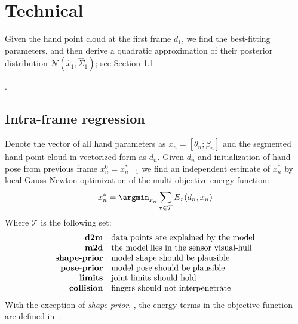 \section{Technical}
Given the hand point cloud at the first frame $d_1$, we find the best-fitting parameters, and then derive a quadratic approximation of their posterior distribution $\mathcal{N}(\hat x_1, \hat \Sigma_1)$; see Section \ref{sec:independent}.

.

\subsection{Intra-frame regression }
\label{sec:independent}
% 
Denote the vector of all hand parameters as $x_n = [\theta_n; \beta_n]$ and the segmented hand point cloud in vectorized form as $d_n$. Given $d_n$ and initialization of hand pose from previous frame $x_n^0 = x_{n - 1}^*$ we find an independent estimate of $x_n^*$ by local Gauss-Newton optimization of the multi-objective energy function:
% 
\begin{equation}
x_n^* = \argmin_{x_n} \sum_{\tau \in \mathcal{T}} E_{\tau}(d_n, x_n) 
\label{eq:energies}
\end{equation}
% 
Where $\mathcal{T}$ is the following set:
%
\vspace{-.5\parskip}
\begin{equation*}
\setlength{\jot}{0pt}
\begin{aligned}
\text{\textbf{d2m}} & \quad \text{data points are explained by the model} \\ 
\text{\textbf{m2d}} & \quad \text{the model lies in the sensor visual-hull} \\
\text{\textbf{shape-prior}} & \quad \text{model shape should be plausible} \\
\text{\textbf{pose-prior}} & \quad \text{model pose should be plausible} \\
\text{\textbf{limits}} & \quad \text{joint limits should hold} \\
\text{\textbf{collision}} & \quad \text{fingers should not interpenetrate} 
\end{aligned}
\end{equation*}
With the exception of \emph{shape-prior}, , the energy terms in the objective function are defined in~\cite{tkach2016sphere}.

